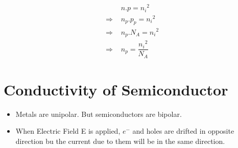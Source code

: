 \documentclass[a4aper,12pt]{report}
\begin{document}
\vspace*{-10pt}
\begin{align*}
    &n.p = {n_i}^2 \\ 
    \Rightarrow\, \,&n_p.p_p = {n_i}^2\\
    \Rightarrow \,\,&n_p.N_A = {n_i}^2 \\
    \Rightarrow\, \, &n_p = \dfrac{{n_i}^2}{N_A}
\end{align*}




\section{Conductivity of Semiconductor}
\begin{itemize}
    \item Metals are unipolar. But semiconductors are bipolar. 
    \item When Electric Field E is applied, $e^-$ and holes are drifted in opposite direction bu the current due to them will be in the same direction. 
\end{itemize}
\end{document}
